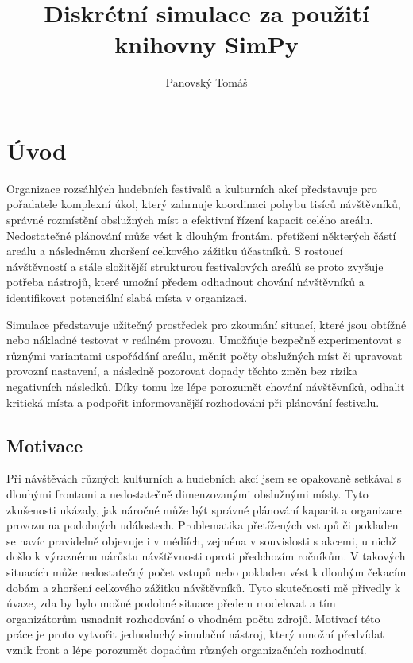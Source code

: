 \documentclass[
  program=itp,
  biblatex,
  figures=false,
  glossaries,
  index
]{kidiplom}
\title{Diskrétní simulace za použití knihovny SimPy}
\author{Panovský Tomáš}
\begin{document}
\maketitle


\section{Úvod}
Organizace rozsáhlých hudebních festivalů a kulturních akcí představuje pro pořadatele komplexní úkol, který zahrnuje koordinaci pohybu tisíců návštěvníků, správné rozmístění obslužných míst a efektivní řízení kapacit celého areálu. Nedostatečné plánování může vést k dlouhým frontám, přetížení některých částí areálu a následnému zhoršení celkového zážitku účastníků. S rostoucí návštěvností a stále složitější strukturou festivalových areálů se proto zvyšuje potřeba nástrojů, které umožní předem odhadnout chování návštěvníků a identifikovat potenciální slabá místa v organizaci.

Simulace představuje užitečný prostředek pro zkoumání situací, které jsou obtížné nebo nákladné testovat v reálném provozu. Umožňuje bezpečně experimentovat s různými variantami uspořádání areálu, měnit počty obslužných míst či upravovat provozní nastavení, a následně pozorovat dopady těchto změn bez rizika negativních následků. Díky tomu lze lépe porozumět chování návštěvníků, odhalit kritická místa a podpořit informovanější rozhodování při plánování festivalu.

\subsection{Motivace}
Při návštěvách různých kulturních a hudebních akcí jsem se opakovaně setkával s dlouhými frontami a nedostatečně dimenzovanými obslužnými místy. Tyto zkušenosti ukázaly, jak náročné může být správné plánování kapacit a organizace provozu na podobných událostech. Problematika přetížených vstupů či pokladen se navíc pravidelně objevuje i v médiích, zejména v souvislosti s akcemi, u nichž došlo k výraznému nárůstu návštěvnosti oproti předchozím ročníkům. V takových situacích může nedostatečný počet vstupů nebo pokladen vést k dlouhým čekacím dobám a zhoršení celkového zážitku návštěvníků. Tyto skutečnosti mě přivedly k úvaze, zda by bylo možné podobné situace předem modelovat a tím organizátorům usnadnit rozhodování o vhodném počtu zdrojů. Motivací této práce je proto vytvořit jednoduchý simulační nástroj, který umožní předvídat vznik front a lépe porozumět dopadům různých organizačních rozhodnutí.
\end{document}
